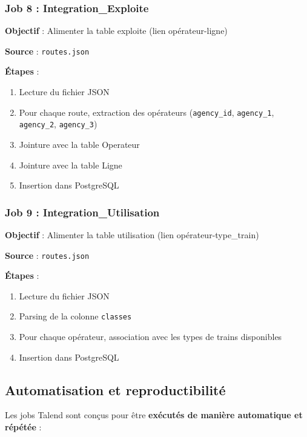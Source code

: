 \documentclass[12pt,a4paper]{article}
\begin{document}
\subsubsection{Job 8 : Integration\_Exploite}

\textbf{Objectif} : Alimenter la table exploite (lien opérateur-ligne)

\textbf{Source} : \texttt{routes.json}

\textbf{Étapes} :
\begin{enumerate}
    \item Lecture du fichier JSON
    \item Pour chaque route, extraction des opérateurs (\texttt{agency\_id}, \texttt{agency\_1}, \texttt{agency\_2}, \texttt{agency\_3})
    \item Jointure avec la table Operateur
    \item Jointure avec la table Ligne
    \item Insertion dans PostgreSQL
\end{enumerate}

\subsubsection{Job 9 : Integration\_Utilisation}

\textbf{Objectif} : Alimenter la table utilisation (lien opérateur-type\_train)

\textbf{Source} : \texttt{routes.json}

\textbf{Étapes} :
\begin{enumerate}
    \item Lecture du fichier JSON
    \item Parsing de la colonne \texttt{classes}
    \item Pour chaque opérateur, association avec les types de trains disponibles
    \item Insertion dans PostgreSQL
\end{enumerate}

\subsection{Automatisation et reproductibilité}

Les jobs Talend sont conçus pour être \textbf{exécutés de manière automatique et répétée} :
\end{document}
